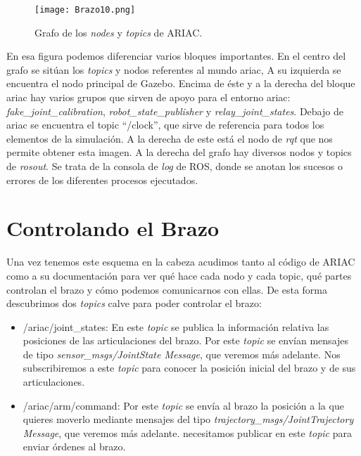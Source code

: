 \begin{figure}[h]
	\centering\texttt{[image: Brazo10.png]}
	\caption{Grafo de los \textit{nodes} y \textit{topics} de ARIAC.}
	\label{fig:ariacgraph2}
\end{figure}

En esa figura podemos diferenciar varios bloques importantes. En el centro del grafo se sitúan los \textit{topics} y nodos referentes al mundo ariac, A su izquierda se encuentra el nodo principal de Gazebo. Encima de éste y a la derecha del bloque ariac hay varios grupos que sirven de apoyo para el entorno ariac: \textit{fake\_joint\_calibration}, \textit{robot\_state\_publisher} y \textit{relay\_joint\_states}.
Debajo de ariac se encuentra el topic \textquotedblleft /clock\textquotedblright  , que sirve de referencia para todos los elementos de la simulación. A la derecha de este está el nodo de \textit{rqt} que nos permite obtener esta imagen. A la derecha del grafo hay diversos nodos y topics de \textit{rosout}. Se trata de la consola de \textit{log} de ROS, donde se anotan los sucesos o errores de los diferentes procesos ejecutados.

\section{Controlando el Brazo}
\label{sec:br_controlandobrazo}

Una vez tenemos este esquema en la cabeza acudimos tanto al código de ARIAC como a su documentación para ver qué hace cada nodo y cada topic, qué partes controlan el brazo y cómo podemos comunicarnos con ellas. De esta forma descubrimos dos \textit{topics} calve para poder controlar el brazo:
\begin{itemize}
	\item /ariac/joint\_states: En este \textit{topic} se publica la información relativa las posiciones de las articulaciones del brazo. Por este \textit{topic} se envían mensajes de tipo \textit{sensor\_msgs/JointState Message}, que veremos más adelante. Nos subscribiremos a este \textit{topic} para conocer la posición inicial del brazo y de sus articulaciones.
	
	\item /ariac/arm/command: Por este \textit{topic} se envía al brazo la posición a la que quieres moverlo mediante mensajes del tipo \textit{trajectory\_msgs/JointTrajectory Message}, que veremos más adelante. necesitamos publicar en este \textit{topic} para enviar órdenes al brazo.
	
\end{itemize}

